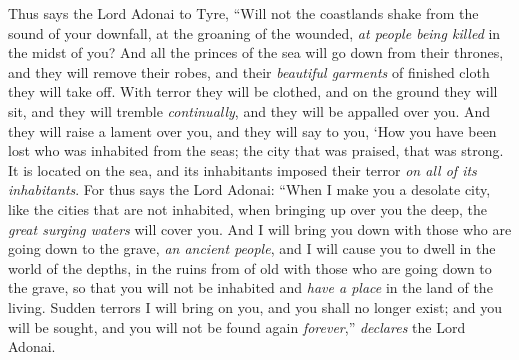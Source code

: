\begin{biblechapter}
\verse Thus says the Lord Adonai to Tyre, “Will not the coastlands shake from the sound of your downfall, at the groaning of the wounded, \textit{at people being killed} in the midst of you?
\verse And all the princes of the sea will go down from their thrones, and they will remove their robes, and their \textit{beautiful garments} of finished cloth they will take off. With terror they will be clothed, and on the ground they will sit, and they will tremble \textit{continually}, and they will be appalled over you.
\verse And they will raise a lament over you, and they will say to you,
\verse ‘How you have been lost who was inhabited from the seas; 
the city that was praised, that was strong. 
It is located on the sea, 
and its inhabitants imposed their terror \textit{on all of its inhabitants}.
\verse For thus says the Lord Adonai: “When I make you a desolate city, like the cities that are not inhabited, when bringing up over you the deep, the \textit{great surging waters} will cover you.
\verse And I will bring you down with those who are going down to the grave, \textit{an ancient people}, and I will cause you to dwell in the world of the depths, in the ruins from of old with those who are going down to the grave, so that you will not be inhabited and \textit{have a place} in the land of the living.
\verse Sudden terrors I will bring on you, and you shall no longer exist; and you will be sought, and you will not be found again \textit{forever},” \textit{declares} the Lord Adonai.
\end{biblechapter}

